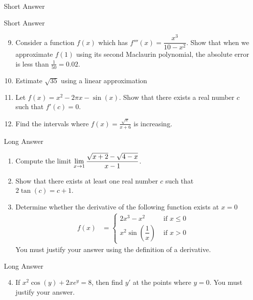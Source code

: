 {\begin{frame}[t]{Short Answer}
\begin{enumerate}[S1.]
\vfill
\end{enumerate}
\end{frame}
\begin{frame}[t]{Short Answer}
\begin{enumerate}[S1.]
\setcounter{enumi}{8}

%
\item \label{S9}  Consider a function $f(x)$ which has $f'''(x)=\dfrac{x^3}{10-x^2}$.
Show 
that when we approximate $f(1)$ using its second Maclaurin polynomial, the 
absolute error is less than $\frac{1}{50}=0.02$.   \hfill{}
\vfill
%
\item  \label{S10}  Estimate $\sqrt{35}$ using a linear approximation   \hfill{}
\vfill
%
\item \label{S11}  Let $f(x)=x^2-2\pi x - \sin(x)$. Show that there exists a real number $c$ such that $f'(c)=0$.
  \hfill{}
\vfill
%
\item  \label{S12}  Find the intervals where $f(x)=\frac{\sqrt{x}}{x+6}$ is increasing.
  \hfill{}
\vfill
%
\end{enumerate}
\end{frame}

\begin{frame}{Long Answer}
\AnswerYes
\begin{enumerate}[L1.]
\item  \label{L1}
Compute the limit $\displaystyle \lim_{x\to 1} \frac{\sqrt{x+2}-\sqrt{4-x}}{x-1}$. \hfill{}
\vfill

\item \label{L2}
Show that there exists at least one real number $c$ such that
$2\tan(c)=c+1$.  \hfill{}
\vfill

\item \label{L3}
Determine whether the derivative of the following function exists at
$x=0$
\begin{align*}
f(x) &=\begin{cases}
  2x^3-x^2 & \text{ if }  x\le 0\\
  x^2\sin\left(\dfrac{1}{x}\right) & \text{ if } x> 0
\end{cases}
\end{align*}
You must justify your answer using the definition of a derivative.

 \hfill{}
\vfill
\end{enumerate}
\end{frame}
\begin{frame}{Long Answer}
\AnswerYes
\begin{enumerate}[L1.]
\setcounter{enumi}{3}
\item \label{L4}
If $x^2\cos(y)+2xe^y = 8$, then find $y'$ at the points where $y=0$.
You must justify your answer.
 \hfill{}
\vfill


\end{enumerate}
\end{frame}}
